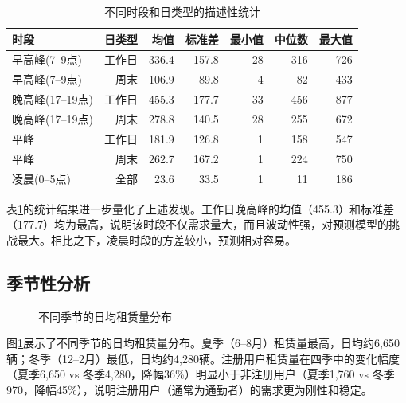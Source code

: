 \documentclass[12pt,a4paper]{article}
\begin{document}
\begin{table}[H]
\centering
\caption{不同时段和日类型的描述性统计}
\label{tab:descriptive}
\small
\begin{tabular}{lrrrrrr}
\toprule
\textbf{时段} & \textbf{日类型} & \textbf{均值} & \textbf{标准差} & \textbf{最小值} & \textbf{中位数} & \textbf{最大值} \\
\midrule
早高峰(7--9点) & 工作日 & 336.4 & 157.8 & 28 & 316 & 726 \\
早高峰(7--9点) & 周末 & 106.9 & 89.8 & 4 & 82 & 433 \\
晚高峰(17--19点) & 工作日 & 455.3 & 177.7 & 33 & 456 & 877 \\
晚高峰(17--19点) & 周末 & 278.8 & 140.5 & 28 & 255 & 672 \\
平峰 & 工作日 & 181.9 & 126.8 & 1 & 158 & 547 \\
平峰 & 周末 & 262.7 & 167.2 & 1 & 224 & 750 \\
凌晨(0--5点) & 全部 & 23.6 & 33.5 & 1 & 11 & 186 \\
\bottomrule
\end{tabular}
\end{table}

表\ref{tab:descriptive}的统计结果进一步量化了上述发现。工作日晚高峰的均值（455.3）和标准差（177.7）均为最高，说明该时段不仅需求量大，而且波动性强，对预测模型的挑战最大。相比之下，凌晨时段的方差较小，预测相对容易。

\subsection{季节性分析}

\begin{figure}[H]
\centering
{}
\caption{不同季节的日均租赁量分布}
\label{fig:seasonal}
\end{figure}

图\ref{fig:seasonal}展示了不同季节的日均租赁量分布。夏季（6--8月）租赁量最高，日均约6,650辆；冬季（12--2月）最低，日均约4,280辆。注册用户租赁量在四季中的变化幅度（夏季6,650 vs 冬季4,280，降幅36\%）明显小于非注册用户（夏季1,760 vs 冬季970，降幅45\%），说明注册用户（通常为通勤者）的需求更为刚性和稳定。
\end{document}
